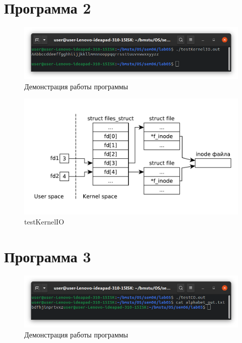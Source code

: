 \documentclass[a4paper,oneside,12pt]{extreport}
\begin{document}
\section*{Программа 2}



\begin{figure}[H]
	\centering
	\includegraphics[width=\linewidth]{inc/img/testKernelIO-runtime}
	\caption{Демонстрация работы программы }
	\label{img:testKernelIO-runtime}
\end{figure}

\begin{figure}[H]
	\centering
	\includegraphics[scale=0.65]{inc/img/testKernelIO}
	\caption{testKernelIO}
	\label{img:testKernelIO}
\end{figure}

\section*{Программа 3}



\begin{figure}[H]
	\centering
	\includegraphics[width=\linewidth]{inc/img/testCO-runtime}
	\caption{Демонстрация работы программы }
	\label{img:testCO-runtime}
\end{figure}
\end{document}

